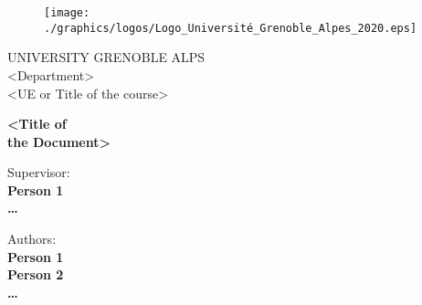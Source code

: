 \documentclass[a4paper, twoside]{report}
\begin{document}





\begin{titlepage}
\begin{figure}[!htb]
    \centering
    \texttt{[image: ./graphics/logos/Logo\_Université\_Grenoble\_Alpes\_2020.eps]}
\end{figure}

\begin{center}
    \LARGE{UNIVERSITY GRENOBLE ALPS}
    \vspace{5mm}
    \\ \large{<Department>}
    \vspace{5mm}
    \\ \LARGE{<UE or Title of the course>}
\end{center}

\vspace{15mm}
\begin{center}
    {\LARGE{\bf <Title of\\\vspace{5mm}the Document>}}
\end{center}
\vspace{30mm}

\begin{minipage}[t]{0.47\textwidth}
	{\large{Supervisor: }{\normalsize\vspace{3mm}
	\bf\\ \large{Person 1 \vspace{2mm}\\\ldots }}}
\end{minipage}
\hfill
\begin{minipage}[t]{0.47\textwidth}\raggedleft
	{\large{Authors:}{\normalsize\vspace{3mm}
    \bf\\ \large{Person 1 \vspace{2mm}\\ Person 2 \vspace{2mm}\\\ldots }}}
\end{minipage}

\vspace{30mm}
\hrulefill
\\
	\\\vspace{2em}

\end{titlepage}
\end{document}
